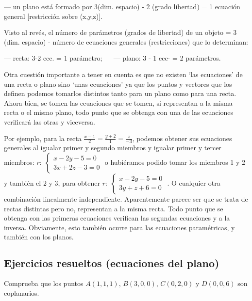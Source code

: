 --- un plano está formado por 3(dim. espacio) - 2 (grado libertad) = 1 ecuación general [restricción sobre (x,y,z)].

Visto al revés, el número de parámetros (grados de libertad) de un objeto = 3 (dim. espacio) - número de ecuaciones generales (restricciones) que lo determinan:

--- recta: 3-2 ecc. = 1 parámetro; $\quad$ --- plano: 3 - 1 ecc- = 2 parámetros.

\noindent * Otra cuestión importante a tener en cuenta es que no existen `las ecuaciones' de una recta o  plano sino `unas ecuaciones' ya que los puntos y vectores que los definen podemos tomarlos distintos tanto para un plano como para una recta. Ahora bien, se tomen las ecuaciones que se tomen, si representan a la misma recta o el mismo plano, todo punto que se obtenga con una de las ecuaciones verificará las otras y viceversa.

Por ejemplo, para la recta $\frac{x-1}{2}=\frac{y+2}{1}=\frac{z}{-3}$, podemos obtener sus ecuaciones generales al igualar primer y segundo miembros y igualar primer y tercer miembros: \scriptsize{$r: \; \begin{cases} x-2y-5=0\\3x+2z-3=0 \end{cases}$} \normalsize{o} hubiéramos podido tomar los miembros 1 y 2 y también el 2 y 3, para obtener \scriptsize{$r:\; \begin{cases} x-2y-5=0\\3y+z+6=0 \end{cases}$} \normalsize{.} O cualquier otra combinación linealmente independiente. Aparentemente parece ser que se trata de rectas distintas pero no, representan a la misma recta. Todo punto que se obtenga con las primeras ecuaciones verifican las segundas ecuaciones y a la inversa. Obviamente, esto también ocurre para las ecuaciones paramétricas, y también con los planos.


\vspace{-2mm}
\subsection{Ejercicios resueltos (ecuaciones del plano)}

\begin{ejre}
Comprueba que los puntos $A(1,1,1)$, $B(3,0,0)$, $C(0,2,0)$	 y $D(0,0,6)$ son coplanarios.
\end{ejre}

